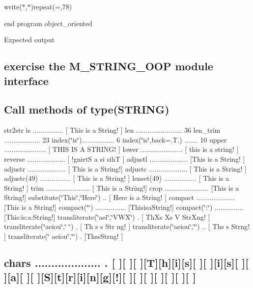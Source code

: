 write($\ast$,$\ast$)repeat(\textquotesingle{}=\textquotesingle{},78)

end program object\+\_\+oriented

Expected output

\subsection*{exercise the M\+\_\+\+S\+T\+R\+I\+N\+G\+\_\+\+O\+OP module interface }

\subsection*{Call methods of type(\+S\+T\+R\+I\+N\+G) }

str2str is ................ \mbox{[} This is a String! \mbox{]} len ........................ 36 len\+\_\+trim ................... 23 index(\char`\"{}is\char`\"{})................. 6 index(\char`\"{}is\char`\"{},back=.T.) ....... 10 upper ...................... \mbox{[} T\+H\+IS IS A S\+T\+R\+I\+N\+G! \mbox{]} lower ...................... \mbox{[} this is a string! \mbox{]} reverse .................... \mbox{[} !gnirtS a si sihT \mbox{]} adjustl .................... \mbox{[}This is a String! \mbox{]} adjustr .................... \mbox{[} This is a String!\mbox{]} adjustc .................... \mbox{[} This is a String! \mbox{]} adjustc(49) ................ \mbox{[} This is a String! \mbox{]} lenset(49) ................. \mbox{[} This is a String! \mbox{]} trim ....................... \mbox{[} This is a String!\mbox{]} crop ....................... \mbox{[}This is a String!\mbox{]} substitute(\char`\"{}\+This\char`\"{},\char`\"{}\+Here\char`\"{}) .. \mbox{[} Here is a String! \mbox{]} compact .................... \mbox{[}This is a String!\mbox{]} compact(\char`\"{}\char`\"{}) ................ \mbox{[}Thisisa\+String!\mbox{]} compact(\char`\"{}\+:\char`\"{}) ............... \mbox{[}This\+:is\+:a\+:String!\mbox{]} transliterate(\char`\"{}aei\char`\"{},\char`\"{}\+V\+W\+X\char`\"{}) . \mbox{[} Th\+Xs Xs V Str\+Xng! \mbox{]} transliterate(\char`\"{}aeiou\char`\"{},\char`\"{} \char`\"{}) . \mbox{[} Th s s Str ng! \mbox{]} transliterate(\char`\"{}aeiou\char`\"{},\char`\"{}\char`\"{}) .. \mbox{[} Ths s Strng! \mbox{]} transliterate(\char`\"{} aeiou\char`\"{},\char`\"{}\char`\"{}) . \mbox{[}Thss\+Strng! \mbox{]} \subsection*{chars .................... . \mbox{[} \mbox{]}\mbox{[} \mbox{]}\mbox{[} \mbox{]}\mbox{[}T\mbox{]}\mbox{[}h\mbox{]}\mbox{[}i\mbox{]}\mbox{[}s\mbox{]}\mbox{[} \mbox{]}\mbox{[} \mbox{]}\mbox{[}i\mbox{]}\mbox{[}s\mbox{]}\mbox{[} \mbox{]}\mbox{[} \mbox{]}\mbox{[}a\mbox{]}\mbox{[} \mbox{]}\mbox{[} \mbox{]}\mbox{[}S\mbox{]}\mbox{[}t\mbox{]}\mbox{[}r\mbox{]}\mbox{[}i\mbox{]}\mbox{[}n\mbox{]}\mbox{[}g\mbox{]}\mbox{[}!\mbox{]}\mbox{[} \mbox{]}\mbox{[} \mbox{]}\mbox{[} \mbox{]}\mbox{[} \mbox{]}\mbox{[} \mbox{]}\mbox{[} \mbox{]}\mbox{[} \mbox{]} }


